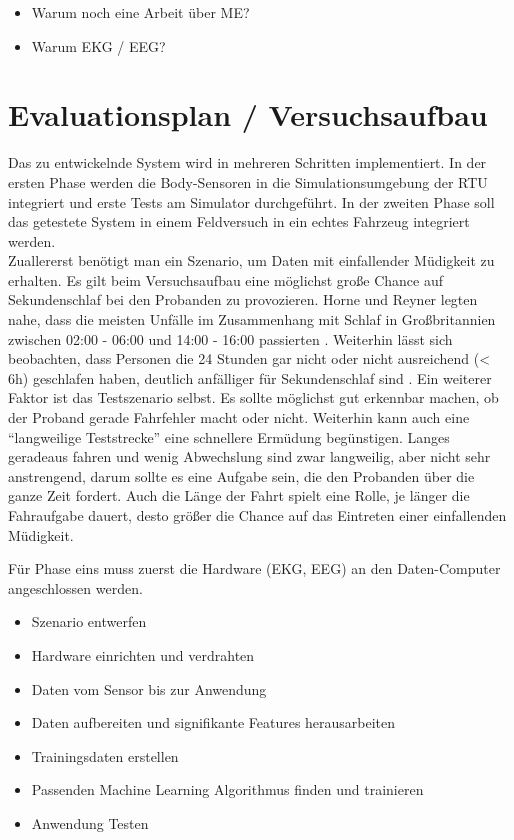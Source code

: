 {\begin{itemize}
  \item Warum noch eine Arbeit über \acl{ME}?
  \item Warum EKG / EEG?
\end{itemize}


\section{Evaluationsplan / Versuchsaufbau}
\label{chap:eval}

Das zu entwickelnde System wird in mehreren Schritten implementiert. In der ersten Phase werden die Body-Sensoren in die Simulationsumgebung der \acl{RTU} integriert und erste Tests am Simulator durchgeführt. In der zweiten Phase soll das getestete System in einem Feldversuch in ein echtes Fahrzeug integriert werden.\\

Zuallererst benötigt man ein Szenario, um Daten mit einfallender Müdigkeit zu erhalten. Es gilt beim Versuchsaufbau eine möglichst große Chance auf Sekundenschlaf bei den Probanden zu provozieren. Horne und Reyner legten nahe, dass die meisten Unfälle im Zusammenhang mit Schlaf in Großbritannien zwischen 02:00 - 06:00 und 14:00 - 16:00 passierten \cite{Horne_1757738}. Weiterhin lässt sich beobachten, dass Personen die 24 Stunden gar nicht oder nicht ausreichend (< 6h) geschlafen haben, deutlich anfälliger für Sekundenschlaf sind \cite{Peters_1}. 
Ein weiterer Faktor ist das Testszenario selbst. Es sollte möglichst gut erkennbar machen, ob der Proband gerade Fahrfehler macht oder nicht. Weiterhin kann auch eine "`langweilige Teststrecke"' eine schnellere Ermüdung begünstigen. Langes geradeaus fahren und wenig Abwechslung sind zwar langweilig, aber nicht sehr anstrengend, darum sollte es eine Aufgabe sein, die den Probanden über die ganze Zeit fordert. Auch die Länge der Fahrt spielt eine Rolle, je länger die Fahraufgabe dauert, desto größer die Chance auf das Eintreten einer einfallenden Müdigkeit.

Für Phase eins muss zuerst die Hardware (EKG, EEG) an den Daten-Computer angeschlossen werden. 

\begin{itemize}
  \item Szenario entwerfen
  \item Hardware einrichten und verdrahten
  \item Daten vom Sensor bis zur Anwendung
  \item Daten aufbereiten und signifikante Features herausarbeiten
  \item Trainingsdaten erstellen
  \item Passenden Machine Learning Algorithmus finden und trainieren
  \item Anwendung Testen
\end{itemize}

}
